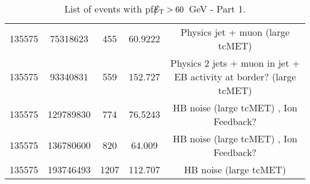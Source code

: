 \begin{table}[htbp]
\begin{center}
\begin{tabular}{|c|c|c|c|c|}
      135575 & 75318623    &  455  &    60.9222  & Physics jet + muon (large tcMET) \\
      135575 & 93340831    &  559  &    152.727  & Physics 2 jets + muon in jet + EB activity at border? (large tcMET) \\
      135575 & 129789830   &  774  &    76.5243  & HB noise (large tcMET) , Ion Feedback? \\
      135575 & 136780600   &  820  &    64.009   & HB noise (large tcMET) , Ion Feedback? \\
      135575 & 193746493   &  1207 &    112.707  & HB noise (large tcMET) \\
      \hline
    \end{tabular}
    \caption{List of events with pf$\big\slash\hspace{-1.6ex}{E_\text{T}}>60$~GeV - Part 1.}        
    \label{tab:pfMETlist1}
  \end{center}
\end{table}
